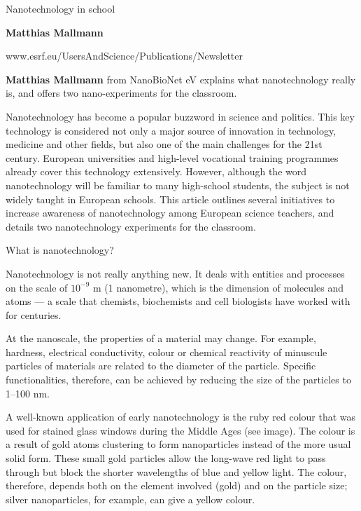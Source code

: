 \documentclass[a4paper]{article}
\newcommand\Math[1]{$\mathrm{#1}$}
\begin{document}
\begin{center}
  Nanotechnology in school
\end{center}

\begin{flushright}
  \textbf{Matthias Mallmann}

  www.esrf.eu/UsersAndScience/Publications/Newsletter
\end{flushright}

\textbf{Matthias Mallmann} from NanoBioNet eV explains what nanotechnology
really is, and offers two nano-experiments for the classroom.

Nanotechnology has become a popular buzzword in science and politics. This key
technology is considered not only a major source of innovation in technology,
medicine and other fields, but also one of the main challenges for the 21st
century. European universities and high-level vocational training programmes
already cover this technology extensively. However, although the word
nanotechnology will be familiar to many high-school students, the subject is not
widely taught in European schools. This article outlines several initiatives to
increase awareness of nanotechnology among European science teachers, and
details two nanotechnology experiments for the classroom.

What is nanotechnology?

Nanotechnology is not really anything new. It deals with entities and processes
on the scale of \Math{10^{-9}} m (1 nanometre), which is the dimension of
molecules and atoms --- a scale that chemists, biochemists and cell biologists
have worked with for centuries.

At the nanoscale, the properties of a material may change. For example,
hardness, electrical conductivity, colour or chemical reactivity of minuscule
particles of materials are related to the diameter of the particle. Specific
functionalities, therefore, can be achieved by reducing the size of the
particles to 1--100 nm.

A well-known application of early nanotechnology is the ruby red colour that was
used for stained glass windows during the Middle Ages (see image). The colour is
a result of gold atoms clustering to form nanoparticles instead of the more
usual solid form. These small gold particles allow the long-wave red light to
pass through but block the shorter wavelengths of blue and yellow light. The
colour, therefore, depends both on the element involved (gold) and on the
particle size; silver nanoparticles, for example, can give a yellow colour.
\end{document}
